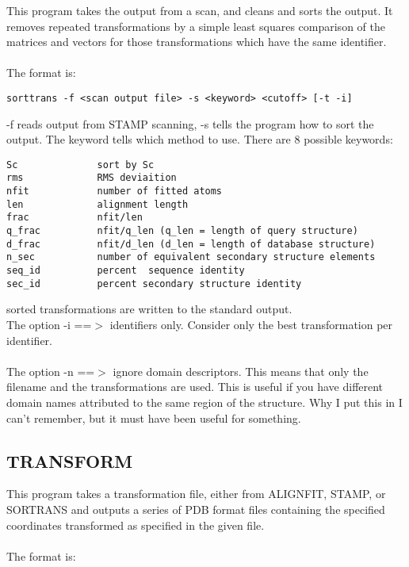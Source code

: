 This program takes the output from a scan, and cleans and sorts the
output.  It removes repeated transformations by a simple least 
squares comparison of the matrices and vectors for those 
transformations which have the same identifier.\\
\\
The format is:\\

\begin{scriptsize}\begin{verbatim}
sorttrans -f <scan output file> -s <keyword> <cutoff> [-t -i]
\end{verbatim} \end{scriptsize}

-f reads output from STAMP scanning, -s tells the program how to 
sort the output.  The keyword tells which method to use.  There
are 8 possible keywords:\\

\begin{scriptsize}\begin{verbatim}
Sc              sort by Sc
rms             RMS deviaition
nfit            number of fitted atoms
len             alignment length
frac            nfit/len
q_frac          nfit/q_len (q_len = length of query structure)
d_frac          nfit/d_len (d_len = length of database structure)
n_sec           number of equivalent secondary structure elements
seq_id          percent  sequence identity
sec_id          percent secondary structure identity
\end{verbatim} \end{scriptsize}

sorted transformations are written to the standard output.
\\
The option -i ==$>$ identifiers only.  Consider only the best
transformation per identifier.\\
\\
The option -n ==$>$ ignore domain descriptors.  This means
that only the filename and the transformations are used.  This is
useful if you have different domain names attributed to the same 
region of the structure.  Why I put this in I can't remember, but it
must have been useful for something.

\subsection{TRANSFORM}

This program takes a transformation file, either from ALIGNFIT,
STAMP, or SORTRANS and outputs a series of PDB format files
containing the specified coordinates transformed as specified in
the given file.\\
\\
The format is:\\

